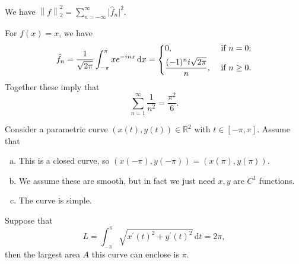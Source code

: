 \begin{eg}\label{eg:Plancherel-identity}
	We have \(\left\lVert f\right\rVert _2^2 = \sum_{n=-\infty}^\infty \vert \hat{f}_n \vert ^2\).
\end{eg}
\begin{explanation}
	For \(f(x) = x\), we have
	\[
		\hat{f}_n = \frac{1}{\sqrt{2\pi}}\int_{-\pi}^\pi x e^{-inx} \,\mathrm{d}x = \begin{dcases}
			0,                            & \text{ if } n=0 ;     \\
			\frac{(-1)^ni\sqrt{2\pi}}{n}, & \text{ if } n\geq 0 .
		\end{dcases}
	\]
	Together these imply that
	\[
		\sum_{n=1}^\infty \frac{1}{n^2} = \frac{\pi^2}{6}.
	\]
\end{explanation}
\begin{eg}
	Consider a parametric curve \((x(t),y(t)) \in \mathbb{R}^2\) with \(t \in [-\pi,\pi]\). Assume that
	\begin{enumerate}[(a)]
		\item This is a closed curve, so \((x(-\pi),y(-\pi)) = (x(\pi),y(\pi))\).
		\item We assume these are smooth, but in fact we just need \(x,y\) are \(C^1\) functions.
		\item The curve is simple.
	\end{enumerate}
	Suppose that
	\[
		L = \int_{-\pi}^\pi \sqrt{x^\prime(t)^2 + y^\prime(t)^2}  \,\mathrm{d}t = 2\pi,
	\]
	then the largest area \(A\) this curve can enclose is \(\pi \).
\end{eg}
